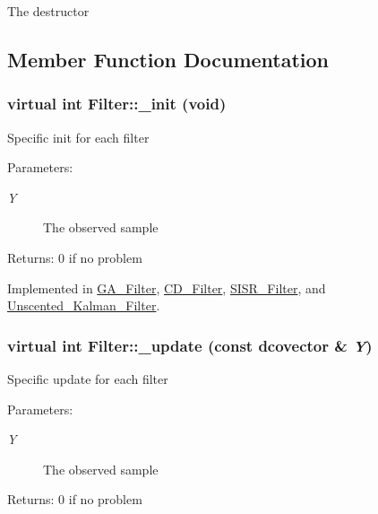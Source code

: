 The destructor 

\subsection{Member Function Documentation}
\hypertarget{class_filter_f46a456184971270ca36733d937f14fb}{
\subsubsection[{\_\-init}]{\setlength{\rightskip}{0pt plus 5cm}virtual int Filter::\_\-init (void)}}
\label{class_filter_f46a456184971270ca36733d937f14fb}


Specific init for each filter

\begin{Desc}
\item[Parameters:]
\begin{description}
\item[{\em Y}]The observed sample\end{description}
\end{Desc}
\begin{Desc}
\item[Returns:]0 if no problem \end{Desc}


Implemented in \hyperlink{class_g_a___filter_7b5cb872bcedd752a4309f114625a4b8}{GA\_\-Filter}, \hyperlink{class_c_d___filter_789c745e24ee5534d22455dff70a93b3}{CD\_\-Filter}, \hyperlink{class_s_i_s_r___filter_307c7a9012848bb6d441020443191725}{SISR\_\-Filter}, and \hyperlink{class_unscented___kalman___filter_a6ca6d9f8b5a4a40c18b6cdfdc2029fa}{Unscented\_\-Kalman\_\-Filter}.\hypertarget{class_filter_20ecd17fed3b8f11a76c960fe5e7144b}{
\subsubsection[{\_\-update}]{\setlength{\rightskip}{0pt plus 5cm}virtual int Filter::\_\-update (const dcovector \& {\em Y})}}
\label{class_filter_20ecd17fed3b8f11a76c960fe5e7144b}


Specific update for each filter

\begin{Desc}
\item[Parameters:]
\begin{description}
\item[{\em Y}]The observed sample\end{description}
\end{Desc}
\begin{Desc}
\item[Returns:]0 if no problem \end{Desc}



